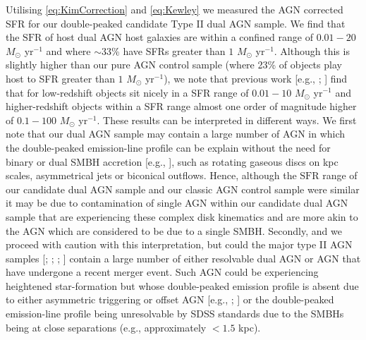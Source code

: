 Utilising \ref{eq:KimCorrection} and \ref{eq:Kewley} we measured the AGN corrected SFR for our double-peaked candidate Type II dual AGN sample. We find that the $\text{SFR}$ of host dual AGN host galaxies are within a confined range of $0.01-20$ $M_{\odot}$ yr$^{-1}$ and where $\sim${33\%} have SFRs greater than $1$ $M_{\odot}$ yr$^{-1}$. Although this is slightly higher than our pure AGN control sample (where 23\% of objects play host to SFR greater than $1$ $M_{\odot}$ yr$^{-1}$), we note that previous work [e.g., \cite{Kauffmann_2003}; \cite{Silverman_2009}] find that for low-redshift objects sit nicely in a SFR range of $0.01-10$ $M_{\odot}$ yr$^{-1}$ and higher-redshift objects within a SFR range almost one order of magnitude higher of $0.1-100$ $M_{\odot}$ yr$^{-1}$. These results can be interpreted in different ways. We first note that our dual AGN sample may contain a large number of AGN in which the double-peaked emission-line profile can be explain without the need for binary or dual SMBH accretion [e.g., \cite{2011ApJ...727...71F}], such as rotating gaseous discs on kpc scales, asymmetrical jets or biconical outflows. Hence, although the $\text{SFR}$ range of our candidate dual AGN sample and our classic AGN control sample were similar it may be due to contamination of single AGN within our candidate dual AGN sample that are experiencing these complex disk kinematics and are more akin to the AGN which are considered to be due to a single SMBH. Secondly, and we proceed with caution with this interpretation, but could the major type II AGN samples [\cite{Kauffmann_2003}; \cite{2006AJZakamska1496Z}; \cite{Gu_2006}; \cite{Silverman_2009}] contain a large number of either resolvable dual AGN or AGN that have undergone a recent merger event. Such AGN could be experiencing heightened star-formation but whose double-peaked emission profile is absent due to either asymmetric triggering or offset AGN [e.g., \cite{2013ApJ...777...64C}; \cite{2015ApJ...806..219C}] or the double-peaked emission-line profile being unresolvable by SDSS standards due to the SMBHs being at close separations (e.g., approximately $<{1.5}$ kpc).   

